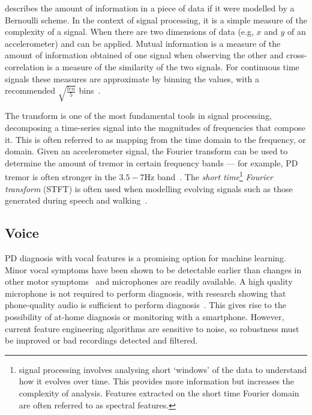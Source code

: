 \documentclass[12pt, twoside]{book}
\renewcommand\emph[1]{\textit{\color{USred}{#1}}}
\begin{document}
\emph{Entropy} describes the amount of information in a piece of data if it were modelled by a Bernoulli scheme. In the context of signal processing, it is a simple measure of the complexity of a signal. When there are two dimensions of data (e.g, $x$ and $y$ of an accelerometer) \emph{mutual information} and \emph{cross correlation} can be applied. Mutual information is a measure of the amount of information obtained of one signal when observing the other and cross-correlation is a measure of the similarity of the two signals. For continuous time signals these measures are approximate by binning the values, with a recommended $\sqrt{\frac{len}{5}}$ bins~\cite{entropymeasures}.

The \emph{Fourier} transform is one of the most fundamental tools in signal processing, decomposing a time-series signal into the magnitudes of frequencies that compose it. This is often referred to as mapping from the time domain to the frequency, or \emph{spectral} domain. Given an accelerometer signal, the Fourier transform can be used to determine the amount of tremor in certain frequency bands --- for example, PD tremor is often stronger in the $3.5-7$Hz band~\cite{duval2004detection}. The \textit{short time}\footnote{\emph{Short time} signal processing involves analysing short `windows' of the data to understand how it evolves over time. This provides more information but increases the complexity of analysis. Features extracted on the short time Fourier domain are often referred to as spectral features.} \textit{Fourier transform} (STFT) is often used when modelling evolving signals such as those generated during speech and walking~\cite{microsoftspeech,deepfft}. 




\subsection{Voice}
PD diagnosis with vocal features is a promising option for machine learning. Minor vocal symptoms have been shown to be detectable earlier than changes in other motor symptoms~\cite{earlyvowel} and  microphones are readily available. A high quality microphone is not required to perform diagnosis, with research showing that phone-quality audio is sufficient to perform diagnosis~\cite{splittledysphonia2009}. This gives rise to the possibility of at-home diagnosis or monitoring with a smartphone. However, current feature engineering algorithms are sensitive to noise, so robustness must be improved or bad recordings detected and filtered.
\end{document}
